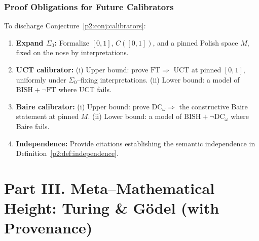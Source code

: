 \documentclass[11pt]{article}
\theoremstyle{definition}
\theoremstyle{remark}
\newcommand{\BISH}{\mathrm{BISH}}
\newcommand{\SigmaZero}{\Sigma_{0}}
\begin{document}
\section{Proof Obligations for Future Calibrators}\label{p2:sec:obligations}

To discharge Conjecture~\ref{p2:conj:calibrators}:
\begin{enumerate}
\item \textbf{Expand \(\SigmaZero\):} Formalize \([0,1]\), \(C([0,1])\), and a pinned Polish space \(M\), fixed on the nose by interpretations.
\item \textbf{UCT calibrator:} (i) Upper bound: prove \(\mathrm{FT}\Rightarrow\) UCT at pinned \([0,1]\), uniformly under \(\SigmaZero\)–fixing interpretations.
(ii) Lower bound: a model of \(\BISH+\neg\mathrm{FT}\) where UCT fails.
\item \textbf{Baire calibrator:} (i) Upper bound: prove \(\mathrm{DC}_\omega\Rightarrow\) the constructive Baire statement at pinned \(M\).
(ii) Lower bound: a model of \(\BISH+\neg\mathrm{DC}_\omega\) where Baire fails.
\item \textbf{Independence:} Provide citations establishing the semantic independence in Definition~\ref{p2:def:independence}.
\end{enumerate}





\part*{Part III. Meta--Mathematical Height: Turing \& G\"odel (with Provenance)}
\end{document}
